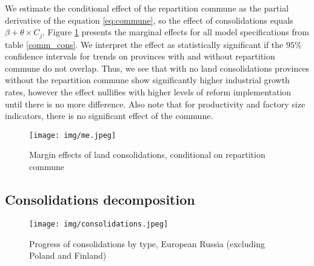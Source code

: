 \documentclass[a4paper, 12pt]{article}
\begin{document}
\noindent We estimate the conditional effect of the repartition commune as the partial derivative of the equation \ref{eq:commune}, so the effect of consolidations equals $\beta + \theta \times C_j$. Figure \ref{fig:me} presents the marginal effects for all model specifications from table \ref{comm_cons}. We interpret the effect as statistically significant if the $95\%$ confidence intervals for trends on provinces with and without repartition commune do not overlap. Thus, we see that with no land consolidations provinces without the repartition commune show significantly higher industrial growth rates, however the effect nullifies with higher levels of reform implementation until there is no more difference. Also note that for productivity and factory size indicators, there is no significant effect of the commune.
\begin{figure}[!htbp]
    \centering
    \texttt{[image: img/me.jpeg]}
    \caption{Margin effects of land consolidations, conditional on repartition commune}
    \label{fig:me}
\end{figure}



\subsection{Consolidations decomposition}

\begin{figure}[!htbp]
    \centering
    \texttt{[image: img/consolidations.jpeg]}
    \caption{Progress of consolidations by type, European Russia (excluding Poland and Finland)}
    \label{fig:cons}
\end{figure}
\end{document}
